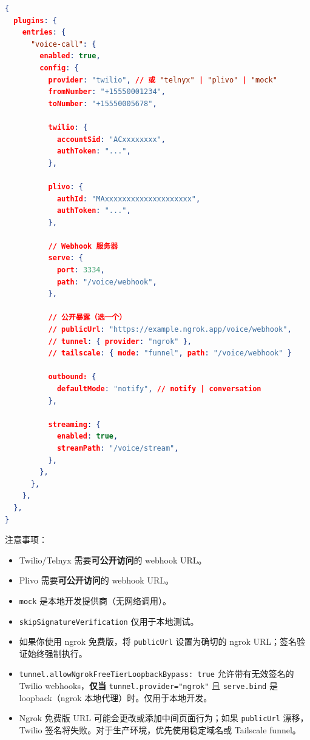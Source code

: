 \begin{lstlisting}[language=json]
{
  plugins: {
    entries: {
      "voice-call": {
        enabled: true,
        config: {
          provider: "twilio", // 或 "telnyx" | "plivo" | "mock"
          fromNumber: "+15550001234",
          toNumber: "+15550005678",

          twilio: {
            accountSid: "ACxxxxxxxx",
            authToken: "...",
          },

          plivo: {
            authId: "MAxxxxxxxxxxxxxxxxxxxx",
            authToken: "...",
          },

          // Webhook 服务器
          serve: {
            port: 3334,
            path: "/voice/webhook",
          },

          // 公开暴露（选一个）
          // publicUrl: "https://example.ngrok.app/voice/webhook",
          // tunnel: { provider: "ngrok" },
          // tailscale: { mode: "funnel", path: "/voice/webhook" }

          outbound: {
            defaultMode: "notify", // notify | conversation
          },

          streaming: {
            enabled: true,
            streamPath: "/voice/stream",
          },
        },
      },
    },
  },
}
\end{lstlisting}


注意事项：

\begin{itemize}
  \item Twilio/Telnyx 需要\textbf{可公开访问}的 webhook URL。
  \item Plivo 需要\textbf{可公开访问}的 webhook URL。
  \item \texttt{mock} 是本地开发提供商（无网络调用）。
  \item \texttt{skipSignatureVerification} 仅用于本地测试。
  \item 如果你使用 ngrok 免费版，将 \texttt{publicUrl} 设置为确切的 ngrok URL；签名验证始终强制执行。
  \item \texttt{tunnel.allowNgrokFreeTierLoopbackBypass: true} 允许带有无效签名的 Twilio webhooks，\textbf{仅当} \texttt{tunnel.provider="ngrok"} 且 \texttt{serve.bind} 是 loopback（ngrok 本地代理）时。仅用于本地开发。
  \item Ngrok 免费版 URL 可能会更改或添加中间页面行为；如果 \texttt{publicUrl} 漂移，Twilio 签名将失败。对于生产环境，优先使用稳定域名或 Tailscale funnel。
\end{itemize}


